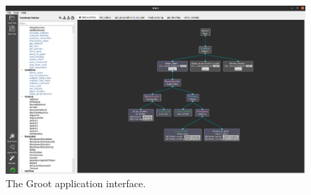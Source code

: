         \begin{figure}[ht]
            \centering
            \includegraphics[width=\linewidth]{images/Groot.png}
            \caption{The Groot application interface.}
            \label{fig:groot}
        \end{figure}
    
